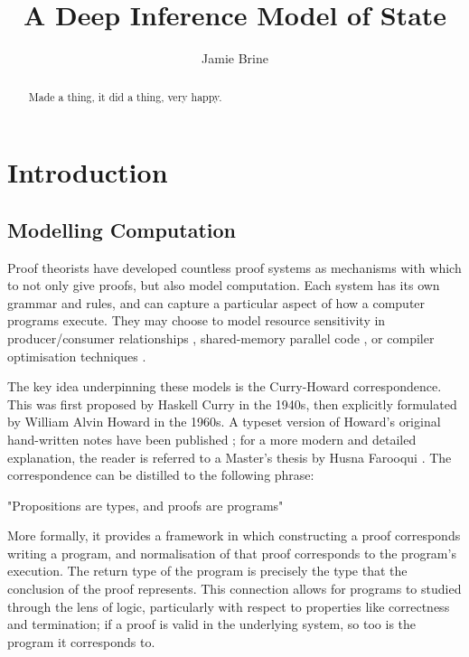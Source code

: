 \documentclass[11pt, oneside]{article}
\title{A Deep Inference Model of State}
\author{Jamie Brine}
\theoremstyle{plain}
\theoremstyle{definition}
\begin{document}
\maketitle

\begin{abstract}
    Made a thing, it did a thing, very happy.
\end{abstract}

\newpage
\tableofcontents

\newpage
\section{Introduction}
\subsection{Modelling Computation}
Proof theorists have developed countless proof systems as mechanisms with which to not only give proofs, but also model computation.
Each system has its own grammar and rules, and can capture a particular aspect of how a computer programs execute.
They may choose to model resource sensitivity in producer/consumer relationships \cite{joshi1996partial}, shared-memory parallel code \cite{woodcock2002unifying}, or compiler optimisation techniques \cite{tate2010generating}.

The key idea underpinning these models is the Curry-Howard correspondence.
This was first proposed by Haskell Curry in the 1940s, then explicitly formulated by William Alvin Howard in the 1960s.
A typeset version of Howard's original hand-written notes have been published \cite{howard1980formulae};
for a more modern and detailed explanation, the reader is referred to a Master's thesis by Husna Farooqui \cite{farooqui2021curry}.
The correspondence can be distilled to the following phrase:

\begin{center}
"Propositions are types, and proofs are programs"
\end{center}

More formally, it provides a framework in which constructing a proof corresponds writing a program, and normalisation of that proof corresponds to the program's execution.
The return type of the program is precisely the type that the conclusion of the proof represents.
This connection allows for programs to studied through the lens of logic, particularly with respect to properties like correctness and termination;
if a proof is valid in the underlying system, so too is the program it corresponds to.
\end{document}
